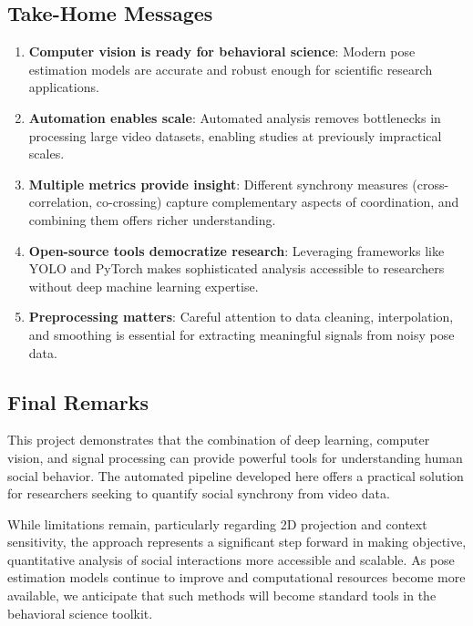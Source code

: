 \documentclass[11pt]{article}
\begin{document}
\subsection{Take-Home Messages}

\begin{enumerate}
    \item \textbf{Computer vision is ready for behavioral science}: Modern pose estimation models are accurate and robust enough for scientific research applications.
    
    \item \textbf{Automation enables scale}: Automated analysis removes bottlenecks in processing large video datasets, enabling studies at previously impractical scales.
    
    \item \textbf{Multiple metrics provide insight}: Different synchrony measures (cross-correlation, co-crossing) capture complementary aspects of coordination, and combining them offers richer understanding.
    
    \item \textbf{Open-source tools democratize research}: Leveraging frameworks like YOLO and PyTorch makes sophisticated analysis accessible to researchers without deep machine learning expertise.
    
    \item \textbf{Preprocessing matters}: Careful attention to data cleaning, interpolation, and smoothing is essential for extracting meaningful signals from noisy pose data.
\end{enumerate}

\subsection{Final Remarks}

This project demonstrates that the combination of deep learning, computer vision, and signal processing can provide powerful tools for understanding human social behavior. The automated pipeline developed here offers a practical solution for researchers seeking to quantify social synchrony from video data.

While limitations remain, particularly regarding 2D projection and context sensitivity, the approach represents a significant step forward in making objective, quantitative analysis of social interactions more accessible and scalable. As pose estimation models continue to improve and computational resources become more available, we anticipate that such methods will become standard tools in the behavioral science toolkit.
\end{document}
